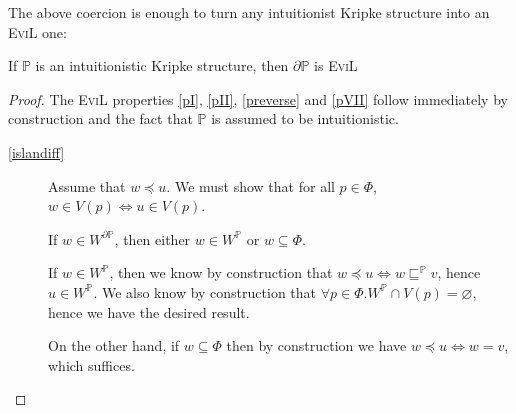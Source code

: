 The above coercion is enough to turn any intuitionist Kripke structure
into an \textsc{EviL} one:
\begin{lemma}\label{turningevil}
If $\mathbb{P}$ is an intuitionistic Kripke structure, then $\partial
\mathbb{P}$ is \textsc{EviL}
\end{lemma}
\begin{proof}
The \textsc{EviL} properties \ref{pI}, \ref{pII}, \ref{preverse} and
\ref{pVII} follow immediately by construction and the fact that
$\mathbb{P}$ is assumed to be intuitionistic. 
 \begin{description}
    \item[\ref{islandiff}]  Assume that $w\preccurlyeq u$.  We must
      show that for all $p \in \Phi$, $w \in V(p) \iff u \in V(p)$.

If $w \in W^{\partial\mathbb{P}}$, then either $w \in W^\mathbb{P}$ or
$w \subseteq \Phi$.

      If $w \in W^\mathbb{P}$, then we know by construction that $w
      \preccurlyeq u \iff w \sqsubseteq^{\mathbb{P}} v$,  hence
       $u \in W^\mathbb{P}$.  We also know by construction that
       $\forall p \in \Phi. W^\mathbb{P} \cap V(p) = \varnothing$,
       hence we have the desired result.

     On the other hand, if $w \subseteq \Phi$ then by construction we
     have $w \preccurlyeq u \iff w = v$, which suffices.


\end{description}
\end{proof}
